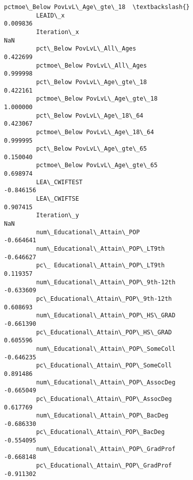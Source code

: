 \documentclass[11pt]{article}
\begin{document}
\begin{Verbatim}[commandchars=\\\{\}]
                                                    pctmoe\_Below PovLvL\_Age\_gte\_18  \textbackslash{}
         LEAID\_x                                                          0.009836   
         Iteration\_x                                                           NaN   
         pct\_Below PovLvL\_All\_Ages                                        0.422699   
         pctmoe\_Below PovLvL\_All\_Ages                                     0.999998   
         pct\_Below PovLvL\_Age\_gte\_18                                      0.422161   
         pctmoe\_Below PovLvL\_Age\_gte\_18                                   1.000000   
         pct\_Below PovLvL\_Age\_18\_64                                       0.423067   
         pctmoe\_Below PovLvL\_Age\_18\_64                                    0.999995   
         pct\_Below PovLvL\_Age\_gte\_65                                      0.150040   
         pctmoe\_Below PovLvL\_Age\_gte\_65                                   0.698974   
         LEA\_CWIFTEST                                                    -0.846156   
         LEA\_CWIFTSE                                                      0.907415   
         Iteration\_y                                                           NaN   
         num\_Educational\_Attain\_POP                                      -0.664641   
         num\_Educational\_Attain\_POP\_LT9th                                -0.646627   
         pc\_ Educational\_Attain\_POP\_LT9th                                 0.119357   
         num\_Educational\_Attain\_POP\_9th-12th                             -0.633609   
         pc\_Educational\_Attain\_POP\_9th-12th                               0.608693   
         num\_Educational\_Attain\_POP\_HS\_GRAD                              -0.661390   
         pc\_Educational\_Attain\_POP\_HS\_GRAD                                0.605596   
         num\_Educational\_Attain\_POP\_SomeColl                             -0.646235   
         pc\_Educational\_Attain\_POP\_SomeColl                               0.891486   
         num\_Educational\_Attain\_POP\_AssocDeg                             -0.665049   
         pc\_Educational\_Attain\_POP\_AssocDeg                               0.617769   
         num\_Educational\_Attain\_POP\_BacDeg                               -0.686330   
         pc\_Educational\_Attain\_POP\_BacDeg                                -0.554095   
         num\_Educational\_Attain\_POP\_GradProf                             -0.668148   
         pc\_Educational\_Attain\_POP\_GradProf                              -0.911302   

\end{Verbatim}
\end{document}

